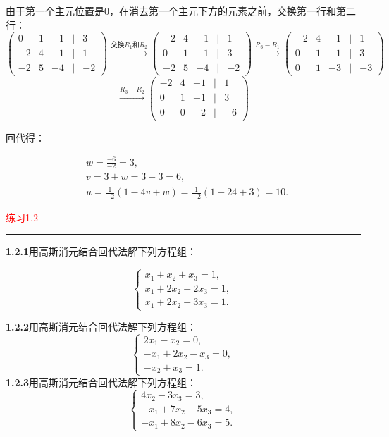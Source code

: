 由于第一个主元位置是0，在消去第一个主元下方的元素之前，交换第一行和第二行：
\[
\begin{pmatrix}
	\boxed{0} & 1 & -1 & \big| & 3 \\
	-2 & 4 & -1 & \big| & 1 \\
	-2 & 5 & -4 & \big| & -2
\end{pmatrix}
\xrightarrow{\text{交换} R_1 \text{和} R_2}
\begin{pmatrix}
	\boxed{-2} & 4 & -1 & \big| & 1 \\
	0 & 1 & -1 & \big| & 3 \\
	-2 & 5 & -4 & \big| & -2
\end{pmatrix}
\xrightarrow{R_3 - R_1}
\begin{pmatrix}
	-2 & 4 & -1 & \big| & 1 \\
	0 & \boxed{1} & -1 & \big| & 3 \\
	0 & 1 & -3 & \big| & -3
\end{pmatrix}
\]
\[
\xrightarrow{R_3 - R_2}
\begin{pmatrix}
	-2 & 4 & -1 & \big| & 1 \\
	0 & 1 & -1 & \big| & 3 \\
	0 & 0 & -2 & \big| & -6
\end{pmatrix}
\]

回代得：

\[\begin{aligned}&w=\frac{-6}{-2}=3,\\&v=3+w=3+3=6,\\&u=\frac{1}{-2}\left(1-4v+w\right)=\frac{1}{-2}\left(1-24+3\right)=10.\end{aligned}\]

\textcolor{red}{练习1.2}
\color{red}\rule{\textwidth}{0.4pt}\color{black}

\textbf{1.2.1}用高斯消元结合回代法解下列方程组：

\[
\begin{cases}
	x_1 + x_2 + x_3 = 1, \\
	x_1 + 2x_2 + 2x_3 = 1, \\
	x_1 + 2x_2 + 3x_3 = 1.
\end{cases}
\]

\textbf{1.2.2}用高斯消元结合回代法解下列方程组：
\[
\begin{cases}
	2x_1 - x_2 = 0, \\
	-x_1 + 2x_2 - x_3 = 0, \\
	-x_2 + x_3 = 1.
\end{cases}
\]
\textbf{1.2.3}用高斯消元结合回代法解下列方程组：
\[
\begin{cases}
	4x_2 - 3x_3 = 3, \\
	-x_1 + 7x_2 - 5x_3 = 4, \\
	-x_1 + 8x_2 - 6x_3 = 5.
\end{cases}
\]

